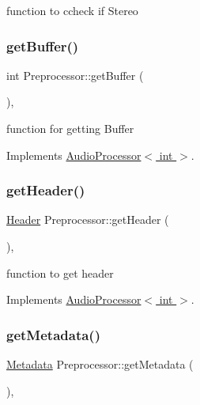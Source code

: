 function to ccheck if Stereo \mbox{\label{classPreprocessor_a6ec2e7b2c9341cf57db47de4cc7e9d84}} 
\subsubsection{\texorpdfstring{get\+Buffer()}{getBuffer()}}
{\footnotesize\ttfamily int Preprocessor\+::get\+Buffer (\begin{DoxyParamCaption}{ }\end{DoxyParamCaption})\hspace{0.3cm}{\ttfamily [override]}, {\ttfamily [virtual]}}

function for getting Buffer 

Implements \hyperlink{classAudioProcessor}{Audio\+Processor$<$ int $>$}.

\mbox{\label{classPreprocessor_a4d5de3e54f8bf6a5b160665dff992337}} 
\subsubsection{\texorpdfstring{get\+Header()}{getHeader()}}
{\footnotesize\ttfamily \hyperlink{structHeader}{Header} Preprocessor\+::get\+Header (\begin{DoxyParamCaption}{ }\end{DoxyParamCaption})\hspace{0.3cm}{\ttfamily [override]}, {\ttfamily [virtual]}}

function to get header 

Implements \hyperlink{classAudioProcessor}{Audio\+Processor$<$ int $>$}.

\mbox{\label{classPreprocessor_aa5520c26dae59270ef25d303d369ce4c}} 
\subsubsection{\texorpdfstring{get\+Metadata()}{getMetadata()}}
{\footnotesize\ttfamily \hyperlink{structMetadata}{Metadata} Preprocessor\+::get\+Metadata (\begin{DoxyParamCaption}{ }\end{DoxyParamCaption})\hspace{0.3cm}{\ttfamily [override]}, {\ttfamily [virtual]}}

